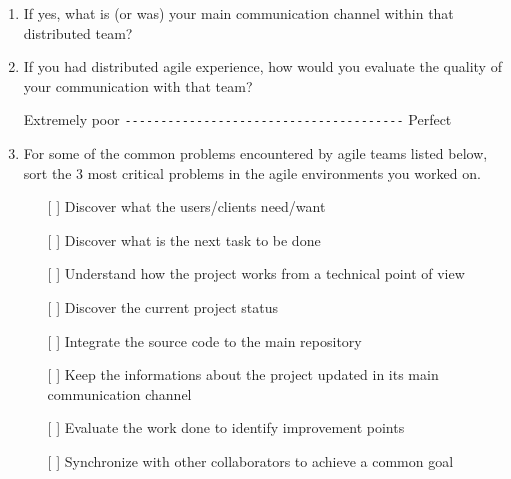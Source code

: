 \documentclass[lnbip]{svmultln}
\begin{document}
\begin{enumerate}
\item If yes, what is (or was) your main communication channel within
  that distributed team?
  \vspace{10pt}

\item If you had distributed agile experience, how would you evaluate
  the quality of your communication with that team?

  Extremely poor \verb=---------------------------------------=
  Perfect \vspace{10pt}

\item For some of the common problems encountered by agile teams
  listed below, sort the 3 most critical problems in the agile
  environments you worked on.
  \begin{itemize}
  \item[[ ] ] Discover what the users/clients need/want
  \item[[ ] ] Discover what is the next task to be done
  \item[[ ] ] Understand how the project works from a technical point
    of view
  \item[[ ] ] Discover the current project status
  \item[[ ] ] Integrate the source code to the main repository
  \item[[ ] ] Keep the informations about the project updated in its
    main communication channel
  \item[[ ] ] Evaluate the work done to identify improvement points
  \item[[ ] ] Synchronize with other collaborators to achieve a common
    goal
  \end{itemize}
  \vspace{10pt}


\end{enumerate}
\end{document}
